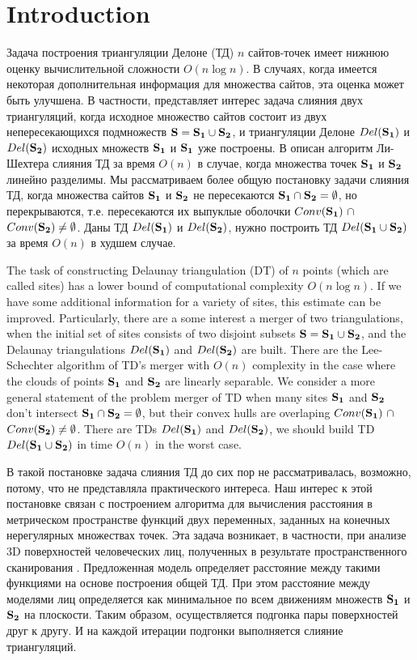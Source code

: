 \documentclass[12pt]{article}
\begin{document}
\section{Introduction}
{\color{green}
Задача построения триангуляции Делоне (ТД) $n$ сайтов-точек имеет нижнюю оценку вычислительной сложности  $O(n\log n)$.
В случаях, когда имеется некоторая дополнительная информация для множества сайтов, эта оценка может быть улучшена.
В частности, представляет интерес задача слияния двух триангуляций, когда исходное множество сайтов состоит из двух непересекающихся подмножеств $\bf{S} = \bf{S_1} \cup \bf{S_2}$, и триангуляции Делоне $Del(\bf{S_1})$ и $Del(\bf{S_2})$  исходных множеств $\bf{S_1}$ и $\bf{S_1}$ уже построены.
В \cite{Lee} описан алгоритм Ли-Шехтера слияния ТД за время $O(n)$ в случае, когда множества точек $\bf{S_1}$ и $\bf{S_2}$ линейно разделимы.
Мы рассматриваем более общую постановку задачи слияния ТД, когда множества сайтов $\bf{S_1}$ и $\bf{S_2}$ не пересекаются $\bf{S_1} \cap \bf{S_2} = \emptyset$, но перекрываются, т.е. пересекаются их выпуклые оболочки
$Conv(\bf{S_1})~\cap$ $Conv(\bf{S_2}) \ne \emptyset$.
Даны ТД $Del(\bf{S_1})$ и $Del(\bf{S_2})$, нужно построить ТД
$Del(\bf{S_1} \cup \bf{S_2})$ за время $O(n)$ в худшем случае.
}

The task of constructing Delaunay triangulation (DT) of $n$ points (which are called sites) has a lower bound of computational complexity $O(n\log n)$.
If we have some additional information for a variety of sites, this estimate can be improved.
Particularly, there are a some interest a merger of two triangulations, when the initial set of sites consists of two disjoint subsets $\bf{S} = \bf{S_1} \cup \bf{S_2} $, and the Delaunay triangulations $Del(\bf{S_1}) $ and $Del(\bf{S_2})$ are built.
There are the Lee-Schechter algorithm \cite{Lee} of TD's merger with $O(n)$ complexity in the case where the clouds of points $\bf{S_1}$ and $\bf{S_2}$ are linearly separable.
We consider a more general statement of the problem merger of TD when many sites $\bf{S_1}$ and $\bf{S_2}$ don't intersect $\bf {S_1}\cap \bf{S_2} = \emptyset$, but their convex hulls are overlaping $Conv(\bf{S_1})~\cap$ $Conv(\bf{S_2})\ne \emptyset$.
There are TDs $Del(\bf{S_1})$ and $Del(\bf{S_2})$, we should build TD $Del(\bf{S_1} \cup \bf {S_2})$ in time $O(n)$ in the worst case.

{\color{green}
В такой постановке задача слияния ТД до сих пор не рассматривалась, возможно, потому, что не представляла практического интереса.
Наш интерес к этой постановке связан с построением алгоритма для вычисления расстояния в метрическом пространстве функций двух переменных, заданных на конечных нерегулярных множествах точек.
Эта задача возникает, в частности, при анализе 3D поверхностей человеческих лиц, полученных в результате пространственного сканирования \cite{Dyshkant}.
Предложенная модель определяет расстояние между такими функциями на основе построения общей ТД.
При этом расстояние между моделями лиц определяется как минимальное по всем движениям множеств $\bf{S_1}$ и $\bf{S_2}$ на плоскости.
Таким образом, осуществляется подгонка пары поверхностей друг к другу.
И на каждой итерации подгонки выполняется слияние триангуляций.
}
\end{document}
